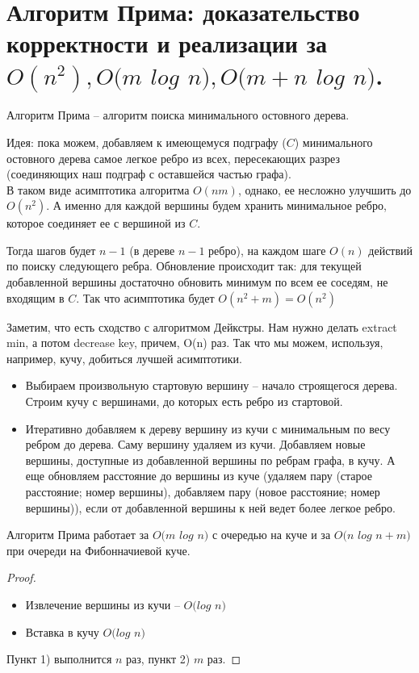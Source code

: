 \setcounter{section}{58}
\section{Алгоритм Прима: доказательство корректности и реализации за $O(n^2), O(m$ $log$ $n), O(m + n$ $log$ $n)$.}

Алгоритм Прима – алгоритм поиска минимального остовного дерева. 

Идея: пока можем, добавляем к имеющемуся подграфу ($C$) минимального остовного дерева самое легкое ребро из всех, пересекающих разрез (соединяющих наш подграф с оставшейся частью графа).\\

В таком виде асимптотика алгоритма $O(nm)$, однако, ее несложно улучшить до $O(n^2)$. А именно для каждой вершины будем хранить минимальное ребро, которое соединяет ее с вершиной из $C$.

Тогда шагов будет $n - 1$ (в дереве $n - 1$ ребро), на каждом шаге $O(n)$ действий по поиску следующего ребра. Обновление происходит так: для текущей добавленной вершины достаточно обновить минимум по всем ее соседям, не входящим в $C$. Так что асимптотика будет $O(n^2 + m) = O(n^2)$

Заметим, что есть сходство с алгоритмом Дейкстры. Нам нужно делать extract min, а потом decrease key, причем, O(n) раз. Так что мы можем, используя, например, кучу, добиться лучшей асимптотики.

\begin{itemize}
    \item Выбираем произвольную стартовую вершину – начало строящегося дерева. Строим кучу с вершинами, до которых есть ребро из стартовой.
    \item Итеративно добавляем к дереву вершину из кучи  с минимальным по весу ребром до дерева. Саму вершину удаляем из кучи. Добавляем новые вершины, доступные из добавленной вершины по ребрам графа, в кучу. А еще обновляем расстояние до вершины из куче  \Big(удаляем пару (старое расстояние; номер вершины), добавляем пару (новое расстояние; номер вершины)\Big), если от добавленной вершины к ней ведет более легкое ребро.
\end{itemize}

\begin{theorem}
Алгоритм Прима работает за $O(m$ $log$ $n)$ с очередью на куче и за $O(n$ $log$ $n + m)$ при очереди на Фибонначиевой куче.
\end{theorem}

\begin{proof}
~~\parbox[t]{0.95\linewidth}{
    \begin{itemize}
        \item Извлечение вершины из кучи – $O(log$ $n)$
        \item Вставка в кучу $O(log$ $n)$
    \end{itemize}
    
    Пункт 1) выполнится $n$ раз, пункт 2) $m$ раз. 
}
\end{proof}

